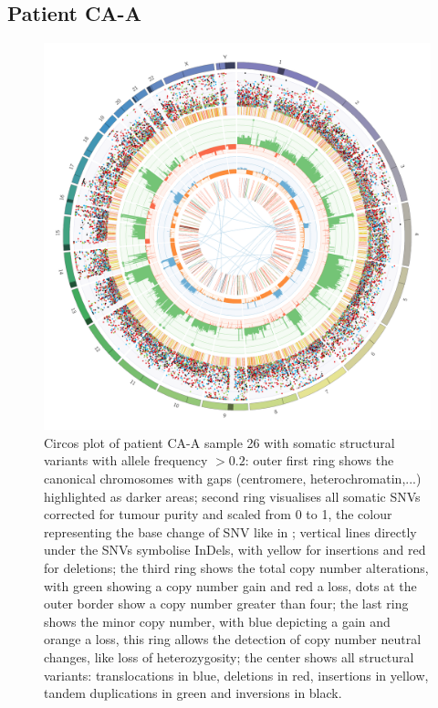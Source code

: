\subsection{Patient CA-A}

\begin{figure}[!ht]
\centering
\includegraphics[width=.99\linewidth]{Figures/CASCADE/CA99/CA99-26.circos.png}
\caption[Circos plot of patient CA-A sample 26]{Circos plot of patient CA-A sample 26 with somatic structural variants with allele frequency $> 0.2$: outer first ring shows the canonical chromosomes with gaps (centromere, heterochromatin,...) highlighted as darker areas; second ring visualises all somatic SNVs corrected for tumour purity and scaled from 0 to 1, the colour representing the base change of SNV like in \protect\textcite{Alexandrov2013}; vertical lines directly under the SNVs symbolise InDels, with yellow for insertions and red for deletions; the third ring shows the total copy number alterations, with green showing a copy number gain and red a loss, dots at the outer border show a copy number greater than four; the last ring shows the minor copy number, with blue depicting a gain and orange a loss, this ring allows the detection of copy number neutral changes, like loss of heterozygosity; the center shows all structural variants: translocations in blue, deletions in red, insertions in yellow, tandem duplications in green and inversions in black.} \label{fig:ca99.26circos}
\end{figure}


